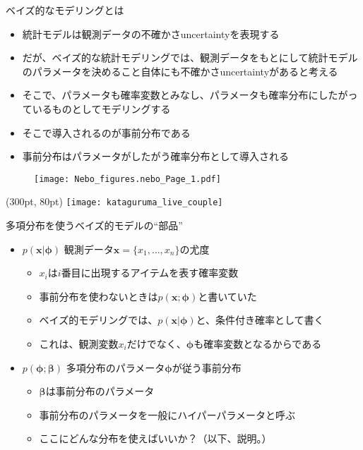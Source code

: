 \documentclass[aspectratio=169,unicode,dvipdfmx,14pt]{beamer}
\begin{document}
\begin{frame}{ベイズ的なモデリングとは}
\begin{itemize}
\item 統計モデルは観測データの不確かさuncertaintyを表現する
\item だが、ベイズ的な統計モデリングでは、観測データをもとにして統計モデルのパラメータを決めること自体にも不確かさuncertaintyがあると考える
\item そこで、パラメータも確率変数とみなし、パラメータも確率分布にしたがっているものとしてモデリングする
\item そこで導入されるのが事前分布である
\item 事前分布はパラメータがしたがう確率分布として導入される
\end{itemize}
\end{frame}

\begin{frame}
\begin{figure}[htbp]
\begin{center}
\vspace{-1.1in}
\texttt{[image: Nebo\_figures.nebo\_Page\_1.pdf]}
\end{center}
\end{figure}
\begin{textblock*}{0.4\linewidth}(300pt, 80pt)
    \centering
    \texttt{[image: kataguruma\_live\_couple]}
\end{textblock*}
\end{frame}


\begin{frame}{多項分布を使うベイズ的モデルの``部品''}
\begin{itemize}
\item $p(\bm{x}|\bm{\phi})$ 観測データ$\bm{x}=\{x_1,\ldots,x_n\}$の尤度
\begin{itemize}
\item $x_i$は$i$番目に出現するアイテムを表す確率変数
\item 事前分布を使わないときは$p(\bm{x};\bm{\phi})$と書いていた
\item ベイズ的モデリングでは、$p(\bm{x}|\bm{\phi})$と、条件付き確率として書く
\item これは、観測変数$x_i$だけでなく、$\bm{\phi}$も確率変数となるからである
\end{itemize}
\item $p(\bm{\phi};\bm{\beta})$ 多項分布のパラメータ$\bm{\phi}$が従う事前分布
\begin{itemize}
\item $\bm{\beta}$は事前分布のパラメータ
\item 事前分布のパラメータを一般にハイパーパラメータと呼ぶ
\item ここにどんな分布を使えばいいか？（以下、説明。）
\end{itemize}
\end{itemize}
\end{frame}
\end{document}
